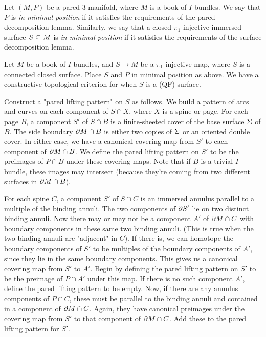 \begin{defn}

Let $(M,P)$ be a pared 3-manifold, where $M$ is a book of $I$-bundles.  We say
that $P$ is \emph{in minimal position} if it satisfies the requirements of the
pared decomposition lemma. Similarly, we say that a closed $\pi_1$-injective
immersed surface $S\subseteq M$ is \emph{in minimal position} if it satisfies the
requirements of the surface decomposition lemma.

\end{defn}

Let $M$ be a book of $I$-bundles, and $S \to M$ be a $\pi_1$-injective map,
where $S$ is a connected closed surface.  Place $S$ and $P$ in minimal position
as above.  We have a constructive topological criterion for when $S$ is a (QF)
surface.

Construct a "pared lifting pattern" on $S$ as follows. We build a pattern of
arcs and curves on each component of $S \cap X$, where $X$ is a spine or page.
For each page $B$, a component $S'$ of $S \cap B$ is a finite-sheeted cover of
the base surface $\Sigma$ of $B$. The side boundary $\partial M \cap B$ is either two
copies of $\Sigma$ or an oriented double cover. In either case, we have
a canonical covering map from $S'$ to each component of $\partial M \cap B$. We
define the pared lifting pattern on $S'$ to be the preimages of $P \cap B$
under these covering maps.  Note that if $B$ is a trivial $I$-bundle, these
images may intersect (because they're coming from two different surfaces in
$\partial M \cap B$).

For each spine $C$, a component $S'$ of $S \cap C$ is an immersed annulus
parallel to a multiple of the binding annuli.  The two components of $\partial S'$
lie on two distinct binding annuli. Now there may or may not be a component
$A'$ of $\partial M \cap C$ with boundary components in these same two binding
annuli.  (This is true when the two binding annuli are "adjacent" in $C$). If
there is, we can homotope the boundary components of $S'$ to be multiples of
the boundary components of $A'$, since they lie in the same boundary
components.  This gives us a canonical covering map from $S'$ to $A'$. Begin by
defining the pared lifting pattern on $S'$ to be the preimage of $P \cap A'$
under this map. If there is no such component $A'$, define the pared lifting
pattern to be empty.  Now, if there are any annulus components of $P \cap C$,
these must be parallel to the binding annuli and contained in a component of
$\partial M \cap C$.  Again, they have canonical preimages under the covering map
from $S'$ to that component of $\partial M \cap C$. Add these to the pared lifting
pattern for $S'$.

